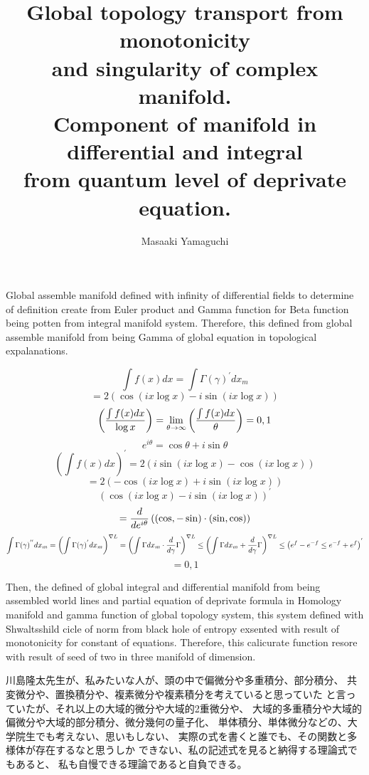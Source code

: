 \documentclass{jsarticle}
\begin{document}
\title{Global topology transport from monotonicity \\
and singularity of complex manifold. \\
Component of manifold in differential and integral \\
from quantum level of deprivate equation.}
\author{Masaaki Yamaguchi}
\date{}
\maketitle

     Global assemble manifold defined with infinity of differential
   fields to determine of definition create from Euler product and
   Gamma function for Beta function being potten from integral manifold
   system. Therefore, this defined from global assemble manifold from
   being Gamma of global equation in topological expalanations.

   $$ \int f(x)dx = \int \Gamma(\gamma)^{'}dx_m $$
   $$ = 2 (\cos (i x \log x) - i \sin(i x \log x)) $$
   $$ \left({{\int f(x) dx} \over \log x}\right) = \lim_{\theta \to \infty}
    \left({{\int f(x) dx} \over \theta}\right) = 0,1 $$
    $$ e^{i \theta} = \cos \theta + i \sin \theta $$
    $$ \left({\int f(x) dx}\right)^{'} = 2 (i \sin(i x \log x) - \cos (i x \log
    x)) $$
    $$ = 2(- \cos(i x \log x) + i \sin(i x \log x)) $$
    $$ (\cos (i x \log x) - i \sin(i x \log x))^{'} $$
    $$ = {d \over {d {e^{i\theta}}}}\left((\cos, - \sin )\cdot
    (\sin, \cos)\right)  $$
    $$ \int \Gamma(\gamma)^{''}dx_m = \left({\int \Gamma(\gamma)^{'}}dx_m
    \right)^{\nabla L} = \left({{\int \Gamma dx_m} \cdot {{d \over d\gamma}
    \Gamma}}\right)^{\nabla L} \le 
    \left({\int \Gamma dx_m + {d \over d\gamma}\Gamma}\right)^{\nabla L} \le 
    \left({e^{f} - e^{-f}} \le {e^{-f} + e^{f}}\right)^{'}  $$
    $$ = 0,1 $$

      Then, the defined of global integral and differential manifold
    from being assembled world lines and partial equation of deprivate
    formula in Homology manifold and gamma function of global topology
    system, this system defined with Shwaltsshild cicle of norm from
    black hole of entropy exsented with result of monotonicity for
    constant of equations.
       Therefore, this calicurate function resore with result of
     seed of two in three manifold of dimension.
  
    川島隆太先生が、私みたいな人が、頭の中で偏微分や多重積分、部分積分、
    共変微分や、置換積分や、複素微分や複素積分を考えていると思っていた
    と言っていたが、それ以上の大域的微分や大域的2重微分や、
    大域的多重積分や大域的偏微分や大域的部分積分、微分幾何の量子化、
    単体積分、単体微分などの、大学院生でも考えない、思いもしない、
    実際の式を書くと誰でも、その関数と多様体が存在するなと思うしか
    できない、私の記述式を見ると納得する理論式でもあると、
    私も自慢できる理論であると自負できる。
\end{document}
